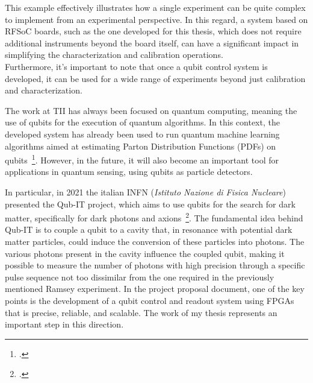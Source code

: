 \documentclass{article}
\begin{document}
%
This example effectively illustrates how a single experiment can be quite complex to implement from an experimental perspective.
In this regard, a system based on RFSoC boards, such as the one developed for this thesis, which does not require additional instruments beyond the board itself, can have a significant impact in simplifying the characterization and calibration operations.\\
Furthermore, it's important to note that once a qubit control system is developed, it can be used for a wide range of experiments beyond just calibration and characterization.

%
The work at TII has always been focused on quantum computing, meaning the use of qubits for the execution of quantum algorithms.
In this context, the developed system has already been used to run quantum machine learning algorithms aimed at estimating Parton Distribution Functions (PDFs) on qubits~\footcite{Robbiati2023}.
%
However, in the future, it will also become an important tool for applications in quantum sensing, using qubits as particle detectors.

%
In particular, in 2021 the italian INFN (\textit{Istituto Nazione di Fisica Nucleare}) presented the Qub-IT project, which aims to use qubits for the search for dark matter, specifically for dark photons and axions~\footcite{qubit_project}.
The fundamental idea behind Qub-IT is to couple a qubit to a cavity that, in resonance with potential dark matter particles, could induce the conversion of these particles into photons.
The various photons present in the cavity influence the coupled qubit, making it possible to measure the number of photons with high precision through a specific pulse sequence not too dissimilar from the one required in the previously mentioned Ramsey experiment.
%
In the project proposal document, one of the key points is the development of a qubit control and readout system using FPGAs that is precise, reliable, and scalable.
%
The work of my thesis represents an important step in this direction.
\end{document}
